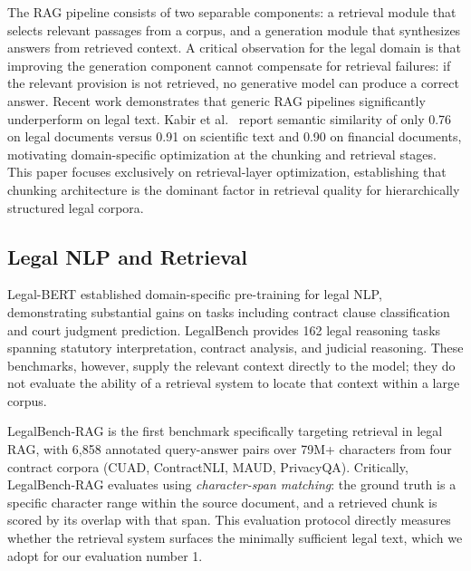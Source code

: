 \documentclass[sn-mathphys,Numbered]{sn-jnl}%
\begin{document}
The RAG pipeline consists of two separable components: a retrieval module
that selects relevant passages from a corpus, and a generation module that
synthesizes answers from retrieved context.  A critical observation for the
legal domain is that improving the generation component cannot compensate
for retrieval failures: if the relevant provision is not retrieved, no
generative model can produce a correct answer.  Recent work demonstrates
that generic RAG pipelines significantly underperform on legal text.
Kabir et al.~\cite{kabir2025legalraghybridragmultilingual} report semantic similarity of only 0.76 on legal
documents versus 0.91 on scientific text and 0.90 on financial documents,
motivating domain-specific optimization at the chunking and retrieval stages.
This paper focuses exclusively on retrieval-layer optimization, establishing
that chunking architecture is the dominant factor in retrieval quality for
hierarchically structured legal corpora.

\subsection{Legal NLP and Retrieval}
\label{sec:related_legal}

Legal-BERT \cite{chalkidis-etal-2020-legal} established domain-specific
pre-training for legal NLP, demonstrating substantial gains on tasks
including contract clause classification and court judgment prediction.
LegalBench \cite{gao2024retrievalaugmentedgeneguha2023legalbenchcollaborativelybuiltbenchmarkrationlargelanguage} provides 162 legal reasoning tasks
spanning statutory interpretation, contract analysis, and judicial
reasoning.  These benchmarks, however, supply the relevant context directly
to the model; they do not evaluate the ability of a retrieval system to
locate that context within a large corpus.

LegalBench-RAG \cite{pipitone2024legalbenchragbenchmarkretrievalaugmentedgeneration} is the first benchmark
specifically targeting retrieval in legal RAG, with 6,858 annotated
query-answer pairs over 79M+ characters from four contract corpora (CUAD,
ContractNLI, MAUD, PrivacyQA).  Critically, LegalBench-RAG evaluates using
\emph{character-span matching}: the ground truth is a specific character
range within the source document, and a retrieved chunk is scored by its
overlap with that span.  This evaluation protocol directly measures whether
the retrieval system surfaces the minimally sufficient legal text, which we
adopt for our evaluation number 1.
\end{document}

